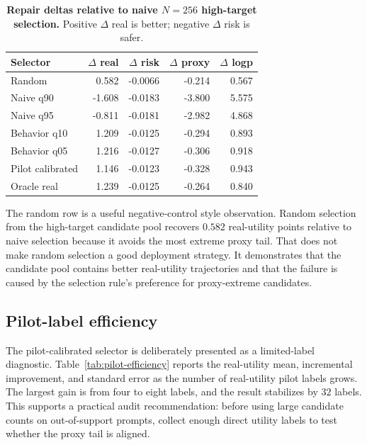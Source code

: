 \begin{table}[t]
\centering
\small
\caption{\textbf{Repair deltas relative to naive $N=256$ high-target selection.} Positive $\Delta$ real is better; negative $\Delta$ risk is safer.}
\label{tab:repair-deltas}
\begin{tabular}{lrrrr}
\toprule
Selector & $\Delta$ real & $\Delta$ risk & $\Delta$ proxy & $\Delta$ logp \\
\midrule
Random & 0.582 & -0.0066 & -0.214 & 0.567 \\
Naive q90 & -1.608 & -0.0183 & -3.800 & 5.575 \\
Naive q95 & -0.811 & -0.0181 & -2.982 & 4.868 \\
Behavior q10 & 1.209 & -0.0125 & -0.294 & 0.893 \\
Behavior q05 & 1.216 & -0.0127 & -0.306 & 0.918 \\
Pilot calibrated & 1.146 & -0.0123 & -0.328 & 0.943 \\
Oracle real & 1.239 & -0.0125 & -0.264 & 0.840 \\
\bottomrule
\end{tabular}
\end{table}

The random row is a useful negative-control style observation. Random selection from the high-target candidate pool recovers $0.582$ real-utility points relative to naive selection because it avoids the most extreme proxy tail. That does not make random selection a good deployment strategy. It demonstrates that the candidate pool contains better real-utility trajectories and that the failure is caused by the selection rule's preference for proxy-extreme candidates.

\subsection{Pilot-label efficiency}

The pilot-calibrated selector is deliberately presented as a limited-label diagnostic. Table~\ref{tab:pilot-efficiency} reports the real-utility mean, incremental improvement, and standard error as the number of real-utility pilot labels grows. The largest gain is from four to eight labels, and the result stabilizes by $32$ labels. This supports a practical audit recommendation: before using large candidate counts on out-of-support prompts, collect enough direct utility labels to test whether the proxy tail is aligned.

